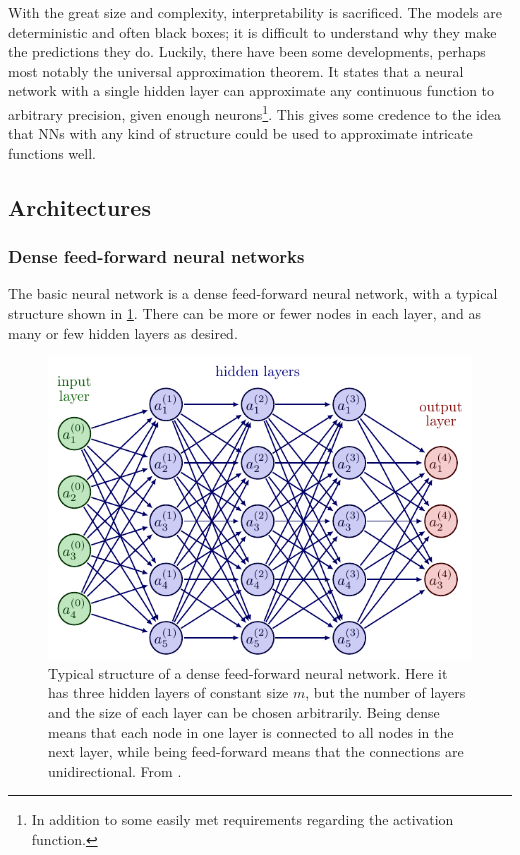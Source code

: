 With the great size and complexity, interpretability is sacrificed.
The models are deterministic and often black boxes; it is difficult to understand why they make the predictions they do.
Luckily, there have been some developments, perhaps most notably the universal approximation theorem.
It states that a neural network with a single hidden layer can approximate any continuous function to arbitrary precision, given enough neurons\footnote{In addition to some easily met requirements regarding the activation function.}.
This gives some credence to the idea that NNs with any kind of structure could be used to approximate intricate functions well.

\subsection{Architectures}
\subsubsection{Dense feed-forward neural networks}
The basic neural network is a dense feed-forward neural network, with a typical structure shown in \cref{fig:nn}.
There can be more or fewer nodes in each layer, and as many or few hidden layers as desired.

\begin{figure}
    \centering
    \includegraphics[width=0.7\linewidth, page=4]{neural_networks.pdf}
    \caption{
        Typical structure of a dense feed-forward neural network.
        Here it has three hidden layers of constant size $m$, but the number of layers and the size of each layer can be chosen arbitrarily.
        Being dense means that each node in one layer is connected to all nodes in the next layer, while being feed-forward means that the connections are unidirectional.
        From \cite{nn_figs}.
    }
    \label{fig:nn}
\end{figure}

